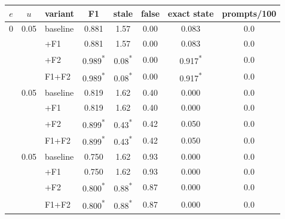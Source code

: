 \begin{tabular}{cclccccc}
\toprule
$e$ & $u$ & variant & F1 & stale & false & exact state & prompts/100 \\
\midrule
0 & 0.05 & baseline & 0.881 & 1.57 & 0.00 & 0.083 & 0.0 \\
 & & +F1 & 0.881 & 1.57 & 0.00 & 0.083 & 0.0 \\
 & & +F2 & 0.989\textsuperscript{*} & 0.08\textsuperscript{*} & 0.00 & 0.917\textsuperscript{*} & 0.0 \\
 & & F1+F2 & 0.989\textsuperscript{*} & 0.08\textsuperscript{*} & 0.00 & 0.917\textsuperscript{*} & 0.0 \\
\addlinespace[2pt]
0.1 & 0.05 & baseline & 0.819 & 1.62 & 0.40 & 0.000 & 0.0 \\
 & & +F1 & 0.819 & 1.62 & 0.40 & 0.000 & 0.0 \\
 & & +F2 & 0.899\textsuperscript{*} & 0.43\textsuperscript{*} & 0.42 & 0.050 & 0.0 \\
 & & F1+F2 & 0.899\textsuperscript{*} & 0.43\textsuperscript{*} & 0.42 & 0.050 & 0.0 \\
\addlinespace[2pt]
0.2 & 0.05 & baseline & 0.750 & 1.62 & 0.93 & 0.000 & 0.0 \\
 & & +F1 & 0.750 & 1.62 & 0.93 & 0.000 & 0.0 \\
 & & +F2 & 0.800\textsuperscript{*} & 0.88\textsuperscript{*} & 0.87 & 0.000 & 0.0 \\
 & & F1+F2 & 0.800\textsuperscript{*} & 0.88\textsuperscript{*} & 0.87 & 0.000 & 0.0 \\
\bottomrule
\end{tabular}
